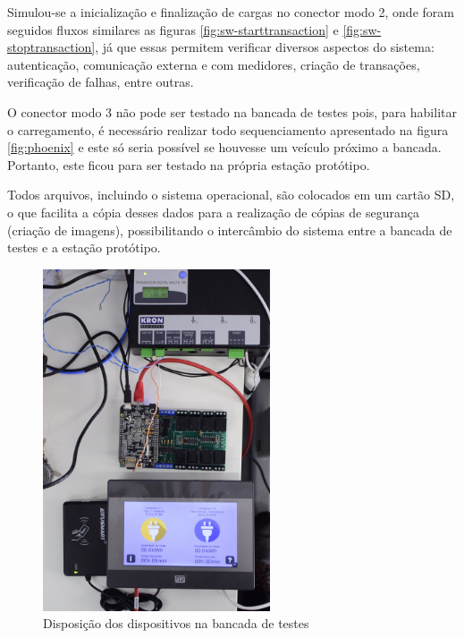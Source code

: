     Simulou-se a inicialização e finalização de cargas no conector modo 2, onde foram seguidos fluxos similares as figuras \ref{fig:sw-starttransaction} e \ref{fig:sw-stoptransaction}, já que essas permitem verificar diversos aspectos do sistema: autenticação, comunicação externa e com medidores, criação de transações, verificação de falhas, entre outras.

    O conector modo 3 não pode ser testado na bancada de testes pois, para habilitar o carregamento, é necessário realizar todo sequenciamento apresentado na figura \ref{fig:phoenix} e este só seria possível se houvesse um veículo próximo a bancada. Portanto, este ficou para ser testado na própria estação protótipo.

    Todos arquivos, incluindo o sistema operacional, são colocados em um cartão SD, o que facilita a cópia desses dados para a realização de cópias de segurança (criação de imagens), possibilitando o intercâmbio do sistema entre a bancada de testes e a estação protótipo.

    \begin{figure}[H]
      \begin{center}
        \includegraphics[width=0.6\textwidth,natwidth=2130,natheight=1420,angle=-90]{assets/images/setup-tests.jpg}
        \caption{Disposição dos dispositivos na bancada de testes}
        \label{fig:setup-tests}
      \end{center}
    \end{figure}

